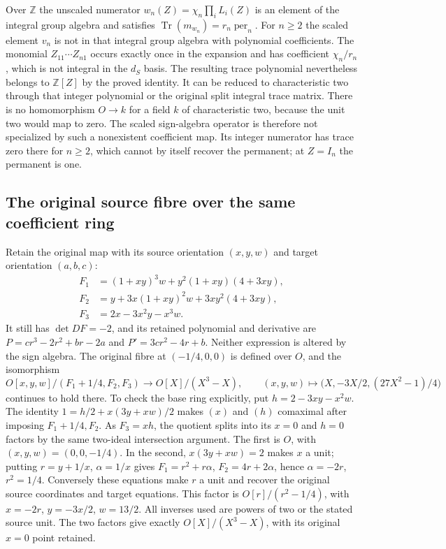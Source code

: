 Over $\mathbb Z$ the unscaled numerator
$w_n(Z)=\chi_n\prod_iL_i(Z)$ is an element of the integral group
algebra and satisfies $\operatorname{Tr}(m_{w_n})=r_n\operatorname{per}_n$.
For $n\ge2$ the scaled element $v_n$ is not in that integral
group algebra with polynomial coefficients. The monomial
$Z_{11}\cdots Z_{n1}$ occurs exactly once in the expansion and has
coefficient $\chi_n/r_n$, which is not integral in the $d_S$ basis.
The resulting trace polynomial nevertheless belongs to $\mathbb Z[Z]$
by the proved identity. It can be reduced to characteristic two
through that integer polynomial or the original split integral trace
matrix. There is no homomorphism $O\to k$ for a field $k$ of
characteristic two, because the unit two would map to zero.
The scaled sign-algebra operator is therefore not specialized by
such a nonexistent coefficient map. Its integer numerator has trace
zero there for $n\ge2$, which cannot by itself recover the permanent;
at $Z=I_n$ the permanent is one.

\subsection{The original source fibre over the same coefficient ring}

Retain the original map with its source orientation $(x,y,w)$ and
target orientation $(a,b,c)$:
\begin{align*}
 F_1&=(1+xy)^3w+y^2(1+xy)(4+3xy),\\
 F_2&=y+3x(1+xy)^2w+3xy^2(4+3xy),\\
 F_3&=2x-3x^2y-x^3w.
\end{align*}
It still has $\det DF=-2$, and its retained polynomial and derivative
are $P=cr^3-2r^2+br-2a$ and $P'=3cr^2-4r+b$. Neither expression
is altered by the sign algebra. The original fibre at $(-1/4,0,0)$
is defined over $O$, and the isomorphism
\[
 O[x,y,w]/(F_1+1/4,F_2,F_3)
 \longrightarrow O[X]/(X^3-X),\qquad
 (x,y,w)\longmapsto\bigl(X,-3X/2,(27X^2-1)/4\bigr)
\]
continues to hold there. To check the base ring explicitly, put
$h=2-3xy-x^2w$. The identity
$1=h/2+x(3y+xw)/2$ makes $(x)$ and $(h)$ comaximal after imposing
$F_1+1/4,F_2$. As $F_3=xh$, the quotient splits into its $x=0$
and $h=0$ factors by the same two-ideal intersection argument.
The first is $O$, with $(x,y,w)=(0,0,-1/4)$. In the second,
$x(3y+xw)=2$ makes $x$ a unit; putting $r=y+1/x$, $\alpha=1/x$
gives $F_1=r^2+r\alpha$, $F_2=4r+2\alpha$, hence
$\alpha=-2r$, $r^2=1/4$. Conversely these equations make $r$
a unit and recover the original source coordinates and target
equations. This factor is $O[r]/(r^2-1/4)$, with
$x=-2r$, $y=-3x/2$, $w=13/2$. All inverses used are powers of
two or the stated source unit. The two factors give exactly
$O[X]/(X^3-X)$, with its original $x=0$ point retained.

